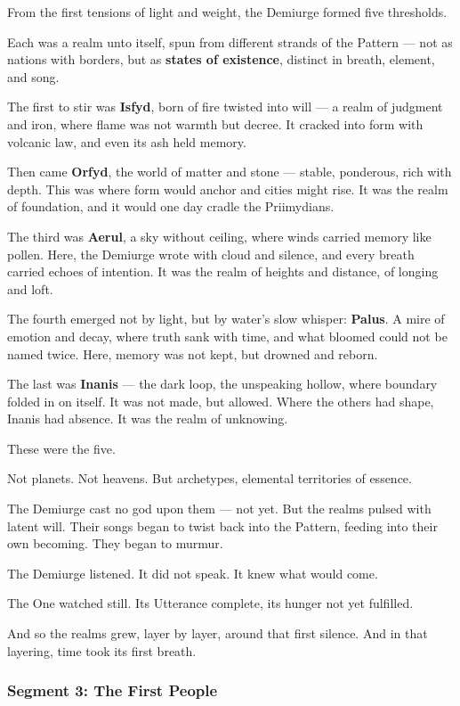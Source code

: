 \documentclass[9pt]{article}
\begin{document}
From the first tensions of light and weight, the Demiurge formed five thresholds.

Each was a realm unto itself, spun from different strands of the Pattern —  
not as nations with borders, but as \textbf{states of existence}, distinct in breath, element, and song.

The first to stir was \textbf{Isfyd}, born of fire twisted into will — a realm of judgment and iron, where flame was not warmth but decree.  
It cracked into form with volcanic law, and even its ash held memory.

Then came \textbf{Orfyd}, the world of matter and stone — stable, ponderous, rich with depth.  
This was where form would anchor and cities might rise.  
It was the realm of foundation, and it would one day cradle the Priimydians.

The third was \textbf{Aerul}, a sky without ceiling, where winds carried memory like pollen.  
Here, the Demiurge wrote with cloud and silence, and every breath carried echoes of intention.  
It was the realm of heights and distance, of longing and loft.

The fourth emerged not by light, but by water’s slow whisper: \textbf{Palus}.  
A mire of emotion and decay, where truth sank with time, and what bloomed could not be named twice.  
Here, memory was not kept, but drowned and reborn.

The last was \textbf{Inanis} — the dark loop, the unspeaking hollow, where boundary folded in on itself.  
It was not made, but allowed.  
Where the others had shape, Inanis had absence.  
It was the realm of unknowing.

These were the five.

Not planets. Not heavens.  
But archetypes, elemental territories of essence.

The Demiurge cast no god upon them — not yet.  
But the realms pulsed with latent will.  
Their songs began to twist back into the Pattern, feeding into their own becoming.  
They began to murmur.

The Demiurge listened. It did not speak.  
It knew what would come.

The One watched still.  
Its Utterance complete, its hunger not yet fulfilled.

And so the realms grew, layer by layer, around that first silence.  
And in that layering, time took its first breath.

\newpage

\subsubsection*{Segment 3: The First People}
\end{document}
